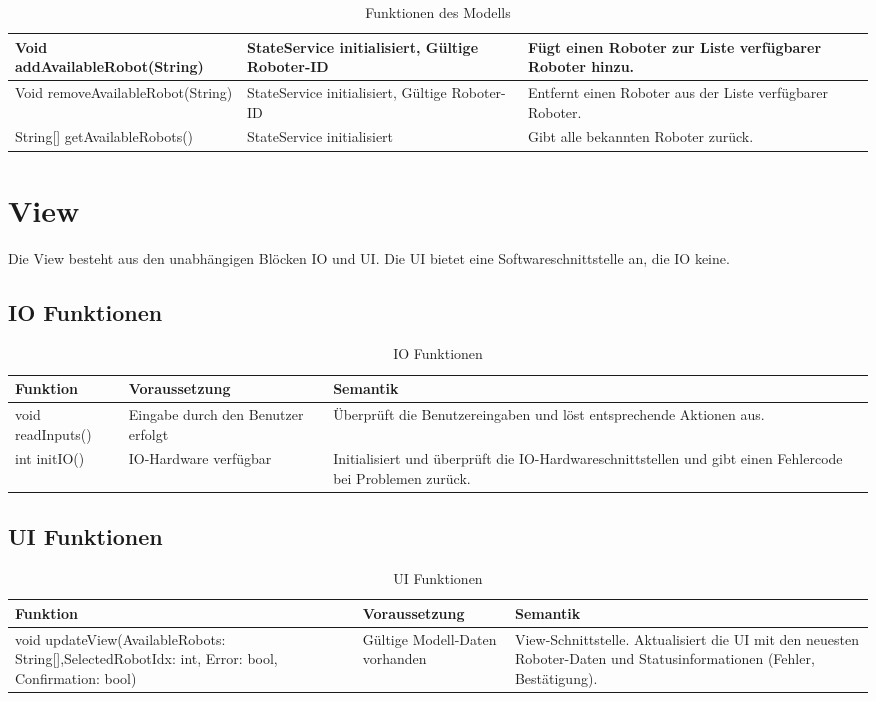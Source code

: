 \begin{table}[h!]
\begin{tabular}{|p{5cm}|p{5cm}|p{5cm}|}
        Void addAvailableRobot(String) & StateService initialisiert, Gültige Roboter-ID & Fügt einen Roboter zur Liste verfügbarer Roboter hinzu. \\
        \hline
        Void removeAvailableRobot(String) & StateService initialisiert, Gültige Roboter-ID & Entfernt einen Roboter aus der Liste verfügbarer Roboter. \\
        \hline
        String[] getAvailableRobots() & StateService initialisiert & Gibt alle bekannten Roboter zurück. \\
        \hline
    \end{tabular}
    \caption{Funktionen des Modells}
    \label{tab:Methodenbeschreibung}
\end{table}

\clearpage
\section{View}
Die View besteht aus den unabhängigen Blöcken IO und UI. Die UI bietet eine Softwareschnittstelle an, die IO keine.

\subsection{IO Funktionen}
\begin{table}[h!]
    \centering
    \begin{tabular}{|p{5cm}|p{5cm}|p{5cm}|}
        \hline
        \textbf{Funktion} & \textbf{Voraussetzung} & \textbf{Semantik} \\
        \hline
        void readInputs() & Eingabe durch den Benutzer erfolgt & Überprüft die Benutzereingaben und löst entsprechende Aktionen aus. \\
        \hline
        int initIO() & IO-Hardware verfügbar & Initialisiert und überprüft die IO-Hardwareschnittstellen und gibt einen Fehlercode bei Problemen zurück. \\
        \hline
    \end{tabular}
    \caption{IO Funktionen}
    \label{tab:IOFunktionen}
\end{table}

\subsection{UI Funktionen}
\begin{table}[h!]
    \centering
    \begin{tabular}{|p{5cm}|p{5cm}|p{5cm}|}
        \hline
        \textbf{Funktion} & \textbf{Voraussetzung} & \textbf{Semantik} \\
        \hline
        void updateView(AvailableRobots: String[],SelectedRobotIdx: int, Error: bool, Confirmation: bool) & Gültige Modell-Daten vorhanden & View-Schnittstelle. Aktualisiert die UI mit den neuesten Roboter-Daten und Statusinformationen (Fehler, Bestätigung). \\ 
        \hline
    \end{tabular}
    \caption{UI Funktionen}
    \label{tab:UIFunktionen}
\end{table}


